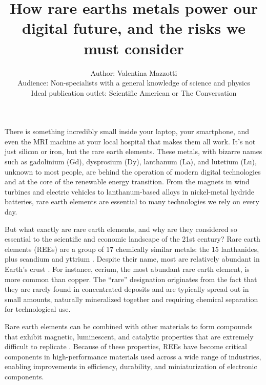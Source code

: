 \documentclass[letterpaper,10pt]{article}
\begin{document}
\title{How rare earths metals power our digital future, and the risks we must consider}
\author{Author: Valentina Mazzotti\\Audience: Non-specialists with a general knowledge of science and physics\\Ideal publication outlet: Scientific American or The Conversation}
\date{}
\maketitle

There is something incredibly small inside your laptop, your smartphone, and even the MRI machine at your local hospital that makes them all work. It’s not just silicon or iron, but the rare earth elements. These metals, with bizarre names such as gadolinium (Gd), dysprosium (Dy), lanthanum (La), and lutetium (Lu), unknown to most people, are behind the operation of modern digital technologies and at the core of the renewable energy transition. From the magnets in wind turbines and electric vehicles to lanthanum-based alloys in nickel-metal hydride batteries, rare earth elements are essential to many technologies we rely on every day.
\newline  
\par
But what exactly are rare earth elements, and why are they considered so essential to the scientific and economic landscape of the 21st century? Rare earth elements (REEs) are a group of 17 chemically similar metals: the 15 lanthanides, plus scandium and yttrium \cite{Gupta1992}. Despite their name, most are relatively abundant in Earth’s crust \cite{Rowlatt2014}. For instance, cerium, the most abundant rare earth element, is more common than copper. The “rare” designation originates from the fact that they are rarely found in concentrated deposits and are typically spread out in small amounts, naturally mineralized together and requiring chemical separation for technological use.
\newline  
\par
Rare earth elements can be combined with other materials to form compounds that exhibit magnetic, luminescent, and catalytic properties that are extremely difficult to replicate \cite{Gschneidner1964}. Because of these properties, REEs have become critical components in high-performance materials used across a wide range of industries, enabling improvements in efficiency, durability, and miniaturization of electronic components. 
\end{document}
